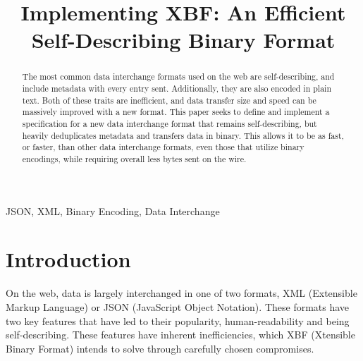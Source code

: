 \documentclass[conference]{IEEEtran}
\begin{document}
\title{Implementing XBF: An Efficient Self-Describing Binary Format}

\author{
	\and
}

\maketitle

\begin{abstract}
	The most common data interchange formats used on the web are self-describing, and include metadata with every entry sent. Additionally, they are also encoded in plain text. Both of these traits are inefficient, and data transfer size and speed can be massively improved with a new format. This paper seeks to define and implement a specification for a new data interchange format that remains self-describing, but heavily deduplicates metadata and transfers data in binary. This allows it to be as fast, or faster, than other data interchange formats, even those that utilize binary encodings, while requiring overall less bytes sent on the wire.
\end{abstract}

\begin{IEEEkeywords}
	JSON, XML, Binary Encoding, Data Interchange
\end{IEEEkeywords}

\section{Introduction}

On the web, data is largely interchanged in one of two formats, XML (Extensible Markup Language)\cite{xml_spec} or JSON (JavaScript Object Notation)\cite{json_spec}. These formats have two key features that have led to their popularity, human-readability and being self-describing. These features have inherent inefficiencies, which XBF (Xtensible Binary Format) intends to solve through carefully chosen compromises.
\end{document}
